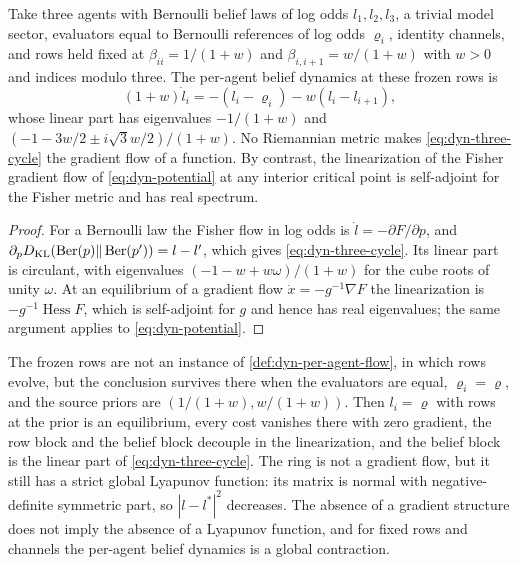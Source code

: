 Take three agents with Bernoulli belief laws of log odds $l_1,l_2,l_3$, a trivial model sector, evaluators equal to Bernoulli references of log odds $\varrho_i$, identity channels, and rows held fixed at $\beta_{ii}=1/(1+w)$ and $\beta_{i,i+1}=w/(1+w)$ with $w>0$ and indices modulo three. The per-agent belief dynamics at these frozen rows is
\begin{equation}
 (1+w)\dot l_i=-(l_i-\varrho_i)-w(l_i-l_{i+1}),
 \label{eq:dyn-three-cycle}
\end{equation}
whose linear part has eigenvalues $-1/(1+w)$ and $(-1-3w/2\pm i\sqrt3w/2)/(1+w)$. No Riemannian metric makes \cref{eq:dyn-three-cycle} the gradient flow of a function. By contrast, the linearization of the Fisher gradient flow of \cref{eq:dyn-potential} at any interior critical point is self-adjoint for the Fisher metric and has real spectrum.
\begin{proof}
For a Bernoulli law the Fisher flow in log odds is $\dot l=-\partial F/\partial p$, and $\partial_pD_{\mathrm{KL}}(\operatorname{Ber}(p)\Vert\operatorname{Ber}(p'))=l-l'$, which gives \cref{eq:dyn-three-cycle}. Its linear part is circulant, with eigenvalues $(-1-w+w\omega)/(1+w)$ for the cube roots of unity $\omega$. At an equilibrium of a gradient flow $\dot x=-g^{-1}\nabla F$ the linearization is $-g^{-1}\operatorname{Hess}F$, which is self-adjoint for $g$ and hence has real eigenvalues; the same argument applies to \cref{eq:dyn-potential}.
\end{proof}

The frozen rows are not an instance of \cref{def:dyn-per-agent-flow}, in which rows evolve, but the conclusion survives there when the evaluators are equal, $\varrho_i=\varrho$, and the source priors are $(1/(1+w),w/(1+w))$. Then $l_i=\varrho$ with rows at the prior is an equilibrium, every cost vanishes there with zero gradient, the row block and the belief block decouple in the linearization, and the belief block is the linear part of \cref{eq:dyn-three-cycle}. The ring is not a gradient flow, but it still has a strict global Lyapunov function: its matrix is normal with negative-definite symmetric part, so $|l-l^*|^2$ decreases. The absence of a gradient structure does not imply the absence of a Lyapunov function, and for fixed rows and channels the per-agent belief dynamics is a global contraction.

